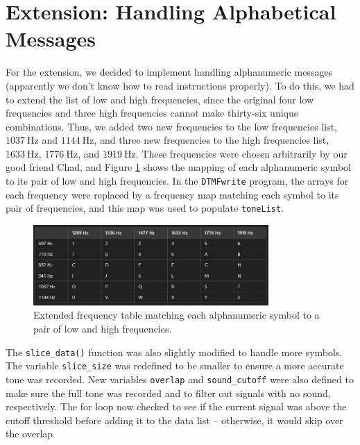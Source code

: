 \documentclass[12pt]{iopart}
\gdef\units#1{~\mathrm{#1}}
\begin{document}
\pagebreak

\section{Extension: Handling Alphabetical Messages}

For the extension, we decided to implement handling alphanumeric messages (apparently we don't know how to read instructions properly).
To do this, we had to extend the list of low and high frequencies, since the original four low frequencies and three high frequencies cannot make thirty-six unique combinations.
Thus, we added two new frequencies to the low frequencies list, $1037 \units{Hz}$ and $1144 \units{Hz}$, and three new frequencies to the high frequencies list, $1633 \units{Hz}$, $1776 \units{Hz}$, and $1919 \units{Hz}$.
These frequencies were chosen arbitrarily by our good friend Chad, and Figure \ref{fig:extended_freq_table} shows the mapping of each alphanumeric symbol to its pair of low and high frequencies. 
In the \verb|DTMFwrite| program, the arrays for each frequency were replaced by a frequency map matching each symbol to its pair of frequencies, and this map was used to populate \verb|toneList|.

\begin{figure}[h!tbp]
  \begin{center}
 \item[]\includegraphics[width=0.8\textwidth]{extended_freq_table.png}
  \caption{\label{fig:extended_freq_table}
  Extended frequency table matching each alphanumeric symbol to a pair of low and high frequencies.
  }
  \end{center}
\end{figure}

The \verb|slice_data()| function was also slightly modified to handle more symbols.
The variable \verb|slice_size| was redefined to be smaller to ensure a more accurate tone was recorded.
New variables \verb|overlap| and \verb|sound_cutoff| were also defined to make sure the full tone was recorded and to filter out signals with no sound, respectively.
The for loop now checked to see if the current signal was above the cutoff threshold before adding it to the data list -- otherwise, it would skip over the overlap.
\end{document}
